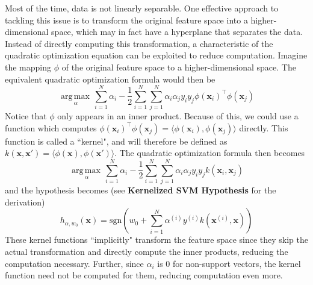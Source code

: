 \documentclass[12pt]{article}
\newcommand{\paren}[1]{\left(#1\right)}
\newcommand{\inner}[2]{\langle#1,#2\rangle}
\newcommand{\argmax}[1]{\underset{#1}{\operatorname{arg\,max\,}}}
\begin{document}
Most of the time, data is not linearly separable. One effective approach to tackling this issue is to transform the original feature space into a higher-dimensional space, which may in fact have a hyperplane that separates the data.
\\\newline
Instead of directly computing this transformation, a characteristic of the quadratic optimization equation can be exploited to reduce computation. Imagine the mapping $\phi$ of the original feature space to a higher-dimensional space. The equivalent quadratic optimization formula would then be
\[ \argmax{\alpha}\sum_{i=1}^N\alpha_i - \frac{1}{2}\sum_{i=1}^{N}\sum_{j=1}^{N}\alpha_i\alpha_jy_iy_j\phi(\mathbf{x}_i)^\top\phi(\mathbf{x}_j) \]
Notice that $\phi$ only appears in an inner product. Because of this, we could use a function which computes $\phi(\mathbf{x}_i)^\top\phi(\mathbf{x}_j) = \inner{\phi(\mathbf{x}_i)}{\phi(\mathbf{x}_j)}$ directly. This function is called a ``kernel", and will therefore be defined as $k(\mathbf{x}, \mathbf{x}') = \inner{\phi(\mathbf{x})}{\phi(\mathbf{x}')}$. The quadratic optimization formula then becomes
\[ \argmax{\alpha}\sum_{i=1}^N\alpha_i - \frac{1}{2}\sum_{i=1}^{N}\sum_{j=1}^{N}\alpha_i\alpha_jy_iy_jk(\mathbf{x}_i, \mathbf{x}_j) \]
and the hypothesis becomes (see \textbf{Kernelized SVM Hypothesis} for the derivation)
\[ h_{\alpha, w_0}(\mathbf{x}) = \text{sgn}\paren{w_0 + \sum_{i=1}^{N}\alpha^{(i)}y^{(i)}k(\mathbf{x}^{(i)}, \mathbf{x})} \]
These kernel functions ``implicitly" transform the feature space since they skip the actual transformation and directly compute the inner products, reducing the computation necessary. Further, since $\alpha_i$ is $0$ for non-support vectors, the kernel function need not be computed for them, reducing computation even more.
\end{document}
